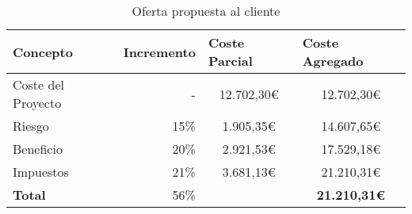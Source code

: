\begin{table}[htbp]
    \centering
    \caption{Oferta propuesta al cliente}
    \label{tab:oferta_propuesta}
    \begin{tabular}{@{}lrcc@{}}
    \toprule
    \textbf{Concepto}  & \multicolumn{1}{l}{\textbf{Incremento}} & \multicolumn{1}{l}{\textbf{Coste Parcial}} & \multicolumn{1}{l}{\textbf{Coste Agregado}} \\ \midrule
    Coste del Proyecto & -                                       & 12.702,30\euro                                 & 12.702,30\euro                                  \\
    Riesgo             & 15\%                                    & 1.905,35\euro                                  & 14.607,65\euro                                  \\
    Beneficio          & 20\%                                    & 2.921,53\euro                                  & 17.529,18\euro                                  \\
    Impuestos          & 21\%                                    & 3.681,13\euro                                  & 21.210,31\euro                                  \\
    \textbf{Total}     & 56\%                                    &                                            & \textbf{21.210,31\euro}                         \\ \bottomrule
    \end{tabular}
    \end{table}
